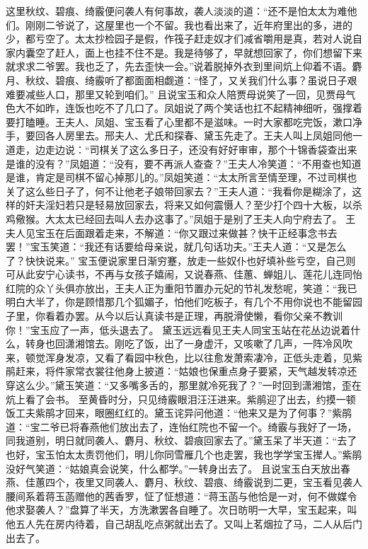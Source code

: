 \documentclass[12pt,oneside]{book}
\begin{document}
这里秋纹、碧痕、绮霰便问袭人有何事故，袭人淡淡的道：“还不是怕太太为难他们。刚刚二爷说了，这屋里也一个不留。我也看出来了，近年府里出的多，进的少，都亏空了。太太抄检园子是假，作筏子赶走奴才们减省嚼用是真，若对人说自家内囊空了赶人，面上也挂不住不是。我是待够了，早就想回家了，你们想留下来就求求二爷罢。我也乏了，先去歪快一会。”说着脱掉外衣到里间炕上仰着不语。麝月、秋纹、碧痕、绮霰听了都面面相觑道：“怪了，又关我们什么事？虽说日子艰难要减些人口，那里又轮到咱们。”
且说宝玉和众人陪贾母说笑了一回，见贾母气色大不如昨，连饭也吃不了几口了。凤姐说了两个笑话也扛不起精神细听，强撑着要打瞌睡。王夫人、凤姐、宝玉看了心里都不是滋味。一时大家都吃完饭，漱口净手，要回各人房里去。邢夫人、尤氏和探春、黛玉先走了。王夫人叫上凤姐同他一道走，边走边说：“司棋关了这么多日子，还没有好好审审，那个十锦香袋查出来是谁的没有？”凤姐道：“没有，要不再派人查查？”王夫人冷笑道：“不用查也知道是谁，肯定是司棋不留心掉那儿的。”凤姐笑道：“太太所言至情至理，不过司棋也关了这么些日子了，何不让他老子娘带回家去？”王夫人道：“我看你是糊涂了，这样的奸夫淫妇若只是轻易放回家去，将来又如何震慑人？至少打个四十大板，以杀鸡儆猴。大太太已经回去叫人去办这事了。”凤姐于是别了王夫人向宁府去了。
王夫人见宝玉在后面跟着走来，不解道：“你又跟过来做甚？快干正经事念书去罢！”宝玉笑道：“我还有话要给母亲说，就几句话功夫。”王夫人道：“又是怎么了？快快说来。”
宝玉便说家里日渐穷蹇，放走一些奴仆也好填补些亏空，自己则可从此安宁心读书，不再与女孩子嬉闹，又说春燕、佳蕙、蝉姐儿、莲花儿连同怡红院的众丫头俱亦放出，王夫人正为重阳节置办元妃的节礼发愁呢，笑道：“我已明白大半了，你是顾惜那几个狐媚子，怕他们吃板子，有几个不用你说也不能留园子里，你看着办罢。从今以后认真读书是正理，再脱滑使懒，看你父亲不教训你！”宝玉应了一声，低头退去了。
黛玉远远看见王夫人同宝玉站在花丛边说着什么，转身也回潇湘馆去。刚吃了饭，出了一身虚汗，又咳嗽了几声，一阵冷风吹来，顿觉浑身发凉，又看了看园中秋色，比以往愈发萧索凄冷，正低头走着，见紫鹃赶来，将件家常衣裳往他身上披道：“姑娘也保重点身子要紧，天气越发转凉还穿这么少。”黛玉笑道：“又多嘴多舌的，那里就冷死我了？”一时回到潇湘馆，歪在炕上看了会书。
至黄昏时分，只见绮霰眼泪汪汪进来。紫鹃迎了出去，约摸一顿饭工夫紫鹃才回来，眼圈红红的。黛玉诧异问他道：“他来又是为了何事？”紫鹃道：“宝二爷已将春燕他们放出去了，连怡红院也不留一个。绮霰与我好了一场，同我道别，明日就同袭人、麝月、秋纹、碧痕回家去了。”黛玉呆了半天道：“去了也好，宝玉怕太太责罚他们，明儿你同雪雁几个也走罢，我也学学宝玉撵人。”紫鹃没好气笑道：“姑娘真会说笑，什么都学。”一转身出去了。
且说宝玉白天放出春燕、佳蕙四个，夜里又同袭人、麝月、秋纹、碧痕、绮霰说到二更，宝玉看见袭人腰间系着蒋玉菡赠他的茜香罗，怔了怔想道：“蒋玉菡与他恰是一对，何不做媒令他求娶袭人？”盘算了半天，方洗漱罢各自睡了。次日昉明一大早，宝玉起来，叫他五人先在房内待着，自己胡乱吃点粥就出去了。又叫上茗烟拉了马，二人从后门出去了。
\end{document}
